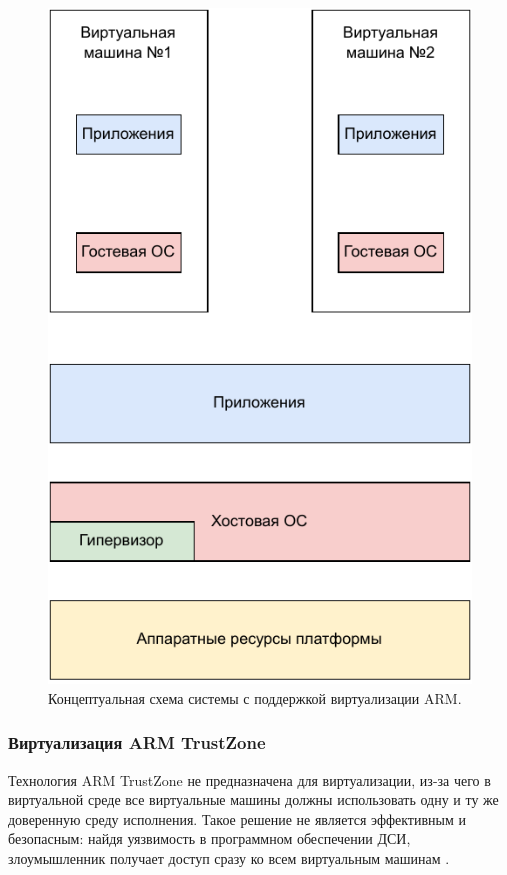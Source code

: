 \begin{figure}[h]
	\centering
	\includegraphics[scale=1]{img/arm-virtualization.pdf}
	\caption{Концептуальная схема системы с поддержкой виртуализации ARM.}
	\label{fig:arm-virtualization}
\end{figure}


\subsubsection{Виртуализация ARM TrustZone}

Технология ARM TrustZone не предназначена для виртуализации, из-за чего в виртуальной среде все виртуальные машины должны использовать одну и ту же доверенную среду исполнения. Такое решение не является эффективным и безопасным: найдя уязвимость в программном обеспечении ДСИ, злоумышленник получает доступ сразу ко всем виртуальным машинам \cite{vtz}.

